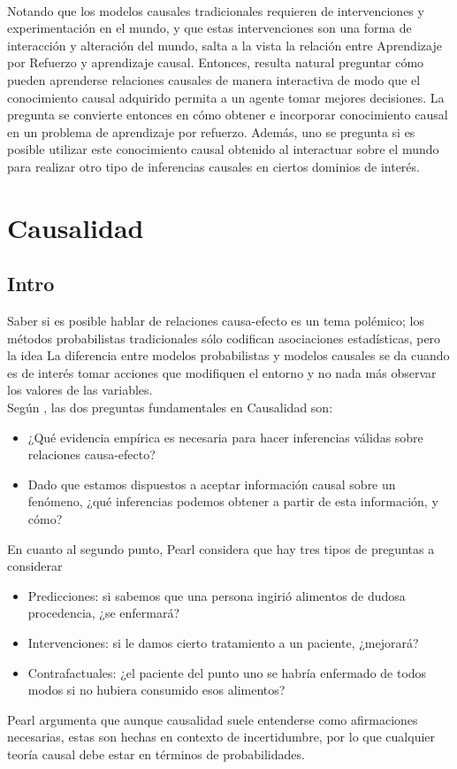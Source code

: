 \documentclass[11pt]{article}
\theoremstyle{plain}
\begin{document}
\\
Notando que los modelos causales tradicionales requieren de intervenciones y experimentación en el mundo, y que estas intervenciones son una forma de interacción y alteración del mundo, salta a la vista la relación entre Aprendizaje por Refuerzo y aprendizaje causal. Entonces, resulta natural preguntar cómo pueden aprenderse relaciones causales de manera interactiva de modo que el conocimiento causal adquirido permita a un agente tomar mejores decisiones. La pregunta se convierte entonces en cómo obtener e incorporar conocimiento causal en un problema de aprendizaje por refuerzo. Además, uno se pregunta si es posible utilizar este conocimiento causal obtenido al interactuar sobre el mundo para realizar otro tipo de inferencias causales en ciertos dominios de interés.
\section{Causalidad}
\subsection{Intro}
Saber si es posible hablar de relaciones causa-efecto es un tema polémico; los métodos probabilistas tradicionales sólo codifican asociaciones estadísticas, pero la idea
La diferencia entre modelos probabilistas y modelos causales se da cuando es de interés tomar acciones que modifiquen el entorno y no nada más observar los valores de las variables. \\
Según \cite{pearl2014probabilistic}, las dos preguntas fundamentales en Causalidad son:
\begin{itemize}
\item ¿Qué evidencia empírica es necesaria para hacer inferencias válidas sobre relaciones causa-efecto?
\item Dado que estamos dispuestos a aceptar información causal sobre un fenómeno, ¿qué inferencias podemos obtener a partir de esta información, y cómo?
\end{itemize}
En cuanto al segundo punto, Pearl considera que hay tres tipos de preguntas a considerar
\begin{itemize}
\item Predicciones: si sabemos que una persona ingirió alimentos de dudosa procedencia, ¿se enfermará?
\item Intervenciones: si le damos cierto tratamiento a un paciente, ¿mejorará?
\item Contrafactuales: ¿el paciente del punto uno se habría enfermado de todos modos si no hubiera consumido esos alimentos?
\end{itemize}
Pearl argumenta que aunque causalidad suele entenderse como afirmaciones necesarias, estas son hechas en contexto de incertidumbre, por lo que cualquier teoría causal debe estar en términos de probabilidades.
\end{document}
